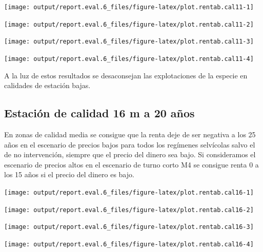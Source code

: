 \documentclass[]{article}
\begin{document}
\begin{center}\texttt{[image: output/report.eval.6\_files/figure-latex/plot.rentab.cal11-1]} \end{center}

\begin{center}\texttt{[image: output/report.eval.6\_files/figure-latex/plot.rentab.cal11-2]} \end{center}

\begin{center}\texttt{[image: output/report.eval.6\_files/figure-latex/plot.rentab.cal11-3]} \end{center}

\begin{center}\texttt{[image: output/report.eval.6\_files/figure-latex/plot.rentab.cal11-4]} \end{center}

A la luz de estos resultados se desaconsejan las explotaciones de la
especie en calidades de estación bajas.

\subsection{Estación de calidad 16 m a 20
años}\label{estaciuxf3n-de-calidad-16-m-a-20-auxf1os}

En zonas de calidad media se consigue que la renta deje de ser negativa
a los 25 años en el escenario de precios bajos para todos los regímenes
selvícolas salvo el de no intervención, siempre que el precio del dinero
sea bajo. Si consideramos el escenario de precios altos en el escenario
de turno corto M4 se consigue renta 0 a los 15 años si el precio del
dinero es bajo.

\begin{center}\texttt{[image: output/report.eval.6\_files/figure-latex/plot.rentab.cal16-1]} \end{center}

\begin{center}\texttt{[image: output/report.eval.6\_files/figure-latex/plot.rentab.cal16-2]} \end{center}

\begin{center}\texttt{[image: output/report.eval.6\_files/figure-latex/plot.rentab.cal16-3]} \end{center}

\begin{center}\texttt{[image: output/report.eval.6\_files/figure-latex/plot.rentab.cal16-4]} \end{center}
\end{document}
